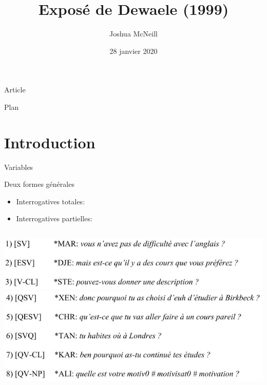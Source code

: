 \documentclass{beamer}
\author{Joshua McNeill}
\date{28 janvier 2020}
\title{Exposé de Dewaele (1999)}
\begin{document}
  \begin{frame}
    \titlepage
  \end{frame}

  \begin{frame}{Article}
  \end{frame}

  \begin{frame}{Plan}
    \tableofcontents
  \end{frame}


  \section{Introduction}

    \begin{frame}{Variables}
      \begin{block}{Deux formes générales}
        \begin{itemize}
          \item Interrogatives totales:
          \item Interrogatives partielles:
        \end{itemize}
      \end{block}
      \begin{columns}
          \includegraphics[scale=0.35]{interrogatives_totales.jpg}
          \includegraphics[scale=0.35]{interrogatives_partielles.jpg}
      \end{columns}
    \end{frame}
\end{document}
